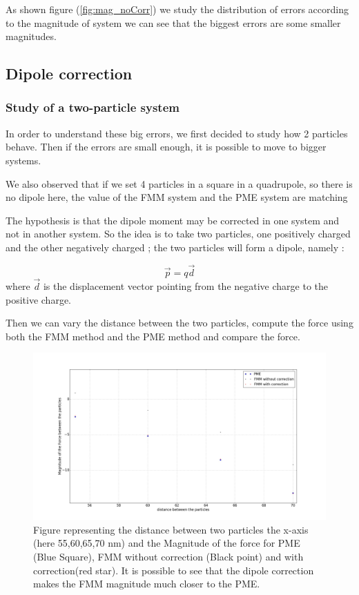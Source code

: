 \documentclass[12pt,twoside,a4paper]{report}
\begin{document}
	As shown figure (\ref{fig:mag_noCorr}) we study the distribution of errors according to the magnitude of system we can see that the biggest errors are some smaller magnitudes.
	

	
\subsection{Dipole correction}
\subsubsection{Study of a two-particle system}
	In order to understand these big errors, we first decided to study how 2 particles behave. Then if the errors are small enough, it is possible to move to bigger systems.
	
We also observed that if we set 4 particles in a square in a quadrupole, so there is no dipole here, the value of the FMM system and the PME system are matching




 	
	
The hypothesis is that the dipole moment may be corrected in one system and not in another system. So the idea is to take two particles, one positively charged and the other negatively charged ; the two particles will form a dipole, namely : 

\begin{equation}
	\vec{p} = q \vec{d}
\end{equation}	
	where $\vec{d}$ is the displacement vector pointing from the negative charge to the positive charge. 
	
	Then we can vary the distance between the two particles, compute the force using both the FMM method and the PME method and compare the force.
	
	
	\begin{figure}[H]
	   \includegraphics[scale=0.2]{dipoleCorrection}
    \centering 
    \caption{Figure representing the distance between two particles the x-axis (here 55,60,65,70 nm) and the  Magnitude of the force for PME (Blue Square), FMM without correction (Black point) and with correction(red star).
     It is possible to see that the dipole correction makes the FMM magnitude much closer to the PME.}    
   \end{figure}  	
	
\end{document}
